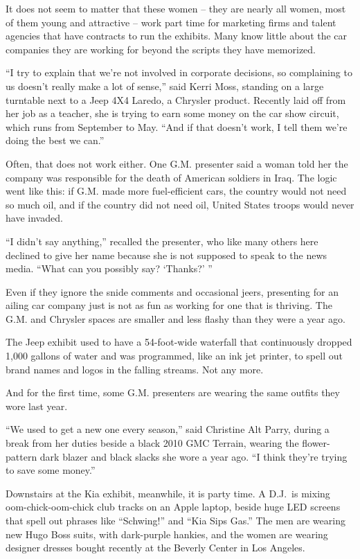\documentclass[12pt,a4paper,onecolumn]{article}
\begin{document}
It does not seem to matter that these women -- they are nearly all women, most of them young and
attractive -- work part time for marketing firms and talent agencies that have contracts to run the
exhibits. Many know little about the car companies they are working for beyond the scripts they have
memorized.

``I try to explain that we're not involved in corporate decisions, so complaining to us doesn't
really make a lot of sense,'' said Kerri Moss, standing on a large turntable next to a Jeep 4X4
Laredo, a Chrysler product. Recently laid off from her job as a teacher, she is trying to earn some
money on the car show circuit, which runs from September to May. ``And if that doesn't work, I tell
them we're doing the best we can.''

Often, that does not work either. One G.M. presenter said a woman told her the company was
responsible for the death of American soldiers in Iraq. The logic went like this: if G.M. made more
fuel-efficient cars, the country would not need so much oil, and if the country did not need oil,
United States troops would never have invaded.

``I didn't say anything,'' recalled the presenter, who like many others here declined to give her
name because she is not supposed to speak to the news media. ``What can you possibly say? `Thanks?'
''

Even if they ignore the snide comments and occasional jeers, presenting for an ailing car company
just is not as fun as working for one that is thriving. The G.M. and Chrysler spaces are smaller and
less flashy than they were a year ago.

The Jeep exhibit used to have a 54-foot-wide waterfall that continuously dropped 1,000 gallons of
water and was programmed, like an ink jet printer, to spell out brand names and logos in the falling
streams. Not any more.

And for the first time, some G.M. presenters are wearing the same outfits they wore last year.

``We used to get a new one every season,'' said Christine Alt Parry, during a break from her duties
beside a black 2010 GMC Terrain, wearing the flower-pattern dark blazer and black slacks she wore a
year ago. ``I think they're trying to save some money.''

Downstairs at the Kia exhibit, meanwhile, it is party time. A D.J.~is mixing oom-chick-oom-chick
club tracks on an Apple laptop, beside huge LED screens that spell out phrases like ``Schwing!'' and
``Kia Sips Gas.'' The men are wearing new Hugo Boss suits, with dark-purple hankies, and the women
are wearing designer dresses bought recently at the Beverly Center in Los Angeles.
\end{document}
